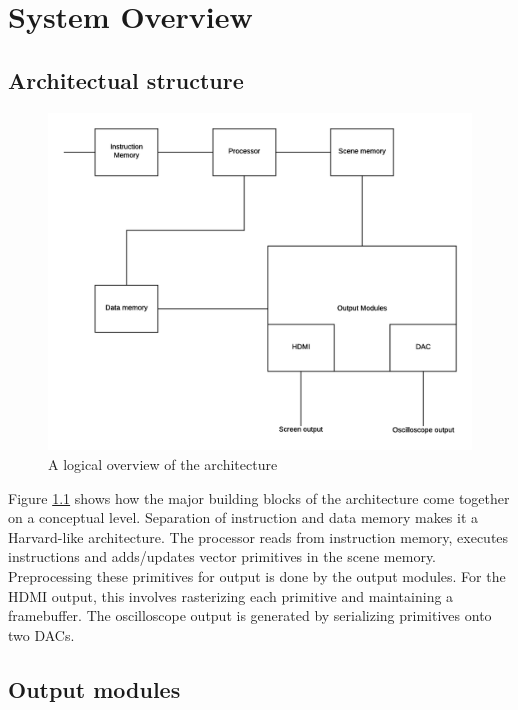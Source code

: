 \chapter{System Overview}

\section{Architectual structure}

\begin{figure}[h!]
    \includegraphics[width=\linewidth]{images/system-overview.png}
    \caption{A logical overview of the \vthreek architecture}
    \label{fig:system-overview}
\end{figure}

Figure \ref{fig:system-overview} shows how the major building blocks of the \vthreek architecture come together on a conceptual level.
Separation of instruction and data memory makes it a Harvard-like architecture.
The processor reads from instruction memory, executes instructions and adds/updates vector primitives in the scene memory.
Preprocessing these primitives for output is done by the output modules.
For the HDMI output, this involves rasterizing each primitive and maintaining a framebuffer.
The oscilloscope output is generated by serializing primitives onto two DACs.


\section{Output modules}

